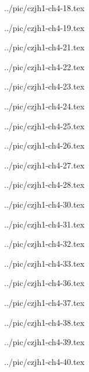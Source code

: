 

../pic/czjh1-ch4-18.tex



../pic/czjh1-ch4-19.tex



../pic/czjh1-ch4-21.tex



../pic/czjh1-ch4-22.tex



../pic/czjh1-ch4-23.tex



../pic/czjh1-ch4-24.tex



../pic/czjh1-ch4-25.tex



../pic/czjh1-ch4-26.tex



../pic/czjh1-ch4-27.tex



../pic/czjh1-ch4-28.tex



../pic/czjh1-ch4-30.tex



../pic/czjh1-ch4-31.tex



../pic/czjh1-ch4-32.tex



../pic/czjh1-ch4-33.tex



../pic/czjh1-ch4-36.tex



../pic/czjh1-ch4-37.tex



../pic/czjh1-ch4-38.tex



../pic/czjh1-ch4-39.tex



../pic/czjh1-ch4-40.tex

